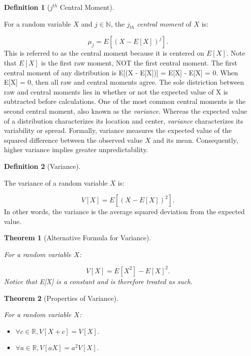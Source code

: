 \documentclass[
]{article}
\providecommand{\tightlist}{%
  \setlength{\itemsep}{0pt}\setlength{\parskip}{0pt}}
\newtheorem{theorem}{Theorem}[section]
\theoremstyle{definition}
\newtheorem{definition}{Definition}[section]
\theoremstyle{definition}
\theoremstyle{definition}
\theoremstyle{remark}
\begin{document}
\begin{definition}[$j^{th}$ Central Moment]
\protect\hypertarget{def:unlabeled-div-65}{}\label{def:unlabeled-div-65}

For a random variable \(X\) and \(j \in \mathbb{N}\), the \(j_{th}\) \emph{central moment} of \(X\) is:

\[\mu_j = E[(X - E[X])^j].\]
This is referred to as the central moment because it is centered on \(E[X]\). Note that \(E[X]\) is the first raw moment, NOT the first central moment. The first central moment of any distribution is E{[}(X - E{[}X{]}){]} = E{[}X{]} - E{[}X{]} = 0. When E{[}X{]} = 0, then all raw and central moments agree. The sole distriction between raw and central moments lies in whether or not the expected value of X is subtracted before calculations. One of the most common central moments is the second central moment, also known as the \emph{variance}. Whereas the expected value of a distribution characterizes its location and center, \emph{variance} characterizes its variability or spread. Formally, variance measures the expected value of the squared difference between the observed value \(X\) and its mean. Consequently, higher variance implies greater unpredictability.

\end{definition}

\begin{definition}[Variance]
\protect\hypertarget{def:unlabeled-div-66}{}\label{def:unlabeled-div-66}

The variance of a random variable \(X\) is:

\[V[X] = E[(X - E[X])^2].\]
In other words, the variance is the average squared deviation from the expected value.

\end{definition}

\begin{theorem}[Alternative Formula for Variance]
\protect\hypertarget{thm:unlabeled-div-67}{}\label{thm:unlabeled-div-67}

For a random variable \(X\):

\[V[X] = E[X^2] - E[X]^2.\]
Notice that E{[}X{]} is a \emph{constant} and is therefore treated as such.

\end{theorem}

\begin{theorem}[Properties of Variance]
\protect\hypertarget{thm:unlabeled-div-68}{}\label{thm:unlabeled-div-68}

For a random variable \(X\):

\begin{itemize}
\tightlist
\item
  \(\forall c \in \mathbb{R}, V[X + c] = V[X].\)
\item
  \(\forall a \in \mathbb{R}, V[aX] = a^2V[X].\)
\end{itemize}

\end{theorem}
\end{document}
